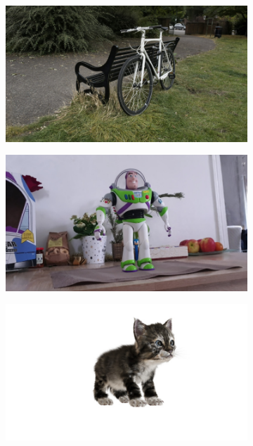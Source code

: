 \vspace{-1.5cm}
\begin{figure}[ht]
  \centering
  \begin{subfigure}{0.31\linewidth}
  \includegraphics[width=\linewidth]{images/renders/bicycle_rgb_52.jpg}
  \end{subfigure}
  \hfill
  \begin{subfigure}{0.31\linewidth}
  \includegraphics[width=\linewidth]{images/renders/buzz1_rgb_49.jpg}
  \end{subfigure}
  \hfill
  \begin{subfigure}{0.31\linewidth}
  \includegraphics[width=\linewidth]{images/renders/kitten_rgb_42.jpg}

\end{subfigure}
\end{figure}
